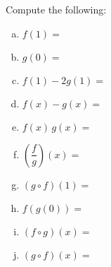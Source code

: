 \documentclass[11pt,letterpaper]{article}
\begin{document}
Compute the following: \pspace
\begin{enumerate}[(a)]
\item $f(1)=$ \vfill
\item $g(0)=$ \vfill
\item $f(1) - 2g(1)=$ \vfill
\item $f(x) - g(x)=$ \vfill
\item $f(x) \, g(x)=$ \vfill
\item $\left( \dfrac{f}{g} \right)(x)=$ \vfill
\item $(g \circ f)(1)=$ \vfill
\item $f(g(0))=$ \vfill
\item $(f \circ g)(x)=$ \vfill
\item $(g \circ f)(x)=$ \vfill
\end{enumerate}










\end{document}
